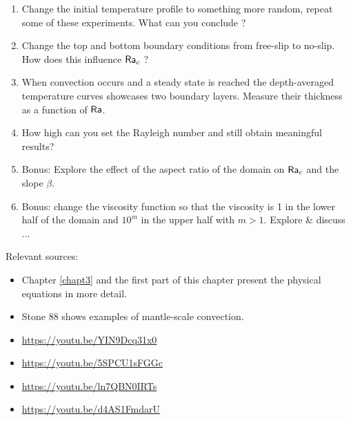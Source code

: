 \begin{enumerate}
\item Change the initial temperature profile to something more random, repeat some of these experiments. 
What can you conclude ?

\item Change the top and bottom boundary conditions from free-slip to no-slip. How 
does this influence ${\mathsf{Ra}}_c$ ?

\item When convection occurs and a steady state is reached the depth-averaged temperature
curves showcases two boundary layers. Measure their thickness as a function of ${\mathsf{Ra}}$.

\item How high can you set the Rayleigh number and still obtain meaningful results?

\item Bonus: Explore the effect of the aspect ratio of the domain on ${\mathsf{Ra}}_c$ and the slope $\beta$.

\item Bonus: change the viscosity function so that the viscosity is 1 in the lower half of the domain 
and $10^m$ in the upper half with $m>1$. Explore \& discuss ...


\end{enumerate}


\vspace{2cm}

Relevant sources:
\begin{itemize}
\item Chapter \ref{chapt3} and the first part of this chapter present the physical equations in more detail. 
\item Stone 88 shows examples of mantle-scale convection.
\item \url{https://youtu.be/YIN9Dcq31x0}
\item \url{https://youtu.be/5SPCU1sFGGc}
\item \url{https://youtu.be/ln7QBN0IRTs}
\item \url{https://youtu.be/d4AS1FmdarU}
\end{itemize} 

%


